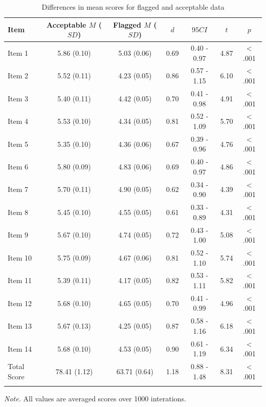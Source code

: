 \documentclass[english,man]{apa6}
\theoremstyle{definition}
\theoremstyle{definition}
\theoremstyle{definition}
\theoremstyle{remark}
\begin{document}
\begin{table}[tbp]
\begin{center}
\begin{threeparttable}
\caption{\label{tab:diff-table}Differences in mean scores for flagged and acceptable data}
\begin{tabular}{lcccccc}
\toprule
Item & \multicolumn{1}{c}{Acceptable $M$ ($SD$)} & \multicolumn{1}{c}{Flagged $M$ ($SD$)} & \multicolumn{1}{c}{$d$} & \multicolumn{1}{c}{$95 CI$} & \multicolumn{1}{c}{$t$} & \multicolumn{1}{c}{$p$}\\
\midrule
Item 1 & 5.86 (0.10) & 5.03 (0.06) & 0.69 & 0.40 - 0.97 & 4.87 & < .001\\
Item 2 & 5.52 (0.11) & 4.23 (0.05) & 0.86 & 0.57 - 1.15 & 6.10 & < .001\\
Item 3 & 5.40 (0.11) & 4.42 (0.05) & 0.70 & 0.41 - 0.98 & 4.91 & < .001\\
Item 4 & 5.53 (0.10) & 4.34 (0.05) & 0.81 & 0.52 - 1.09 & 5.70 & < .001\\
Item 5 & 5.35 (0.10) & 4.36 (0.06) & 0.67 & 0.39 - 0.96 & 4.76 & < .001\\
Item 6 & 5.80 (0.09) & 4.83 (0.06) & 0.69 & 0.40 - 0.97 & 4.86 & < .001\\
Item 7 & 5.70 (0.11) & 4.90 (0.05) & 0.62 & 0.34 - 0.90 & 4.39 & < .001\\
Item 8 & 5.45 (0.10) & 4.55 (0.05) & 0.61 & 0.33 - 0.89 & 4.31 & < .001\\
Item 9 & 5.67 (0.10) & 4.74 (0.05) & 0.72 & 0.43 - 1.00 & 5.08 & < .001\\
Item 10 & 5.75 (0.09) & 4.67 (0.06) & 0.81 & 0.52 - 1.10 & 5.74 & < .001\\
Item 11 & 5.39 (0.11) & 4.17 (0.05) & 0.82 & 0.53 - 1.11 & 5.82 & < .001\\
Item 12 & 5.68 (0.10) & 4.65 (0.05) & 0.70 & 0.41 - 0.99 & 4.96 & < .001\\
Item 13 & 5.67 (0.13) & 4.25 (0.05) & 0.87 & 0.58 - 1.16 & 6.18 & < .001\\
Item 14 & 5.68 (0.10) & 4.53 (0.05) & 0.90 & 0.61 - 1.19 & 6.34 & < .001\\
Total Score & 78.41 (1.12) & 63.71 (0.64) & 1.18 & 0.88 - 1.48 & 8.31 & < .001\\
\bottomrule
\addlinespace
\end{tabular}
\begin{tablenotes}[para]
\textit{Note.} All values are averaged scores over 1000 interations.
\end{tablenotes}
\end{threeparttable}
\end{center}
\end{table}
\end{document}
